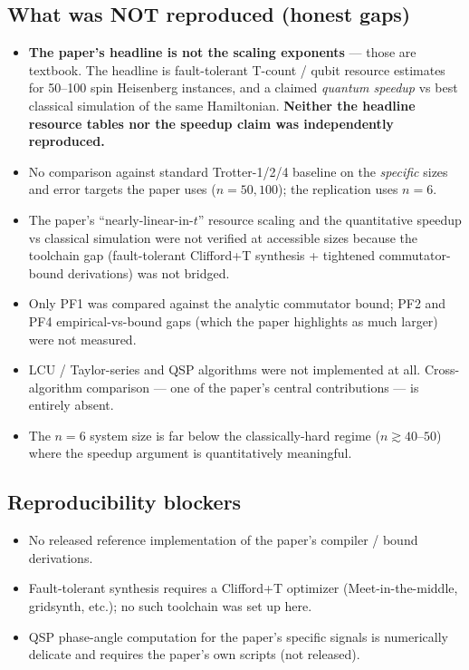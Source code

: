 \documentclass[11pt]{article}
\begin{document}
\subsection*{What was NOT reproduced (honest gaps)}
\begin{itemize}
  \item \textbf{The paper's headline is not the scaling exponents} --- those
  are textbook. The headline is fault-tolerant T-count / qubit resource
  estimates for 50--100 spin Heisenberg instances, and a claimed
  \emph{quantum speedup} vs best classical simulation of the same
  Hamiltonian. \textbf{Neither the headline resource tables nor the speedup
  claim was independently reproduced.}
  \item No comparison against standard Trotter-1/2/4 baseline on the
  \emph{specific} sizes and error targets the paper uses ($n=50,100$);
  the replication uses $n=6$.
  \item The paper's ``nearly-linear-in-$t$'' resource scaling and the
  quantitative speedup vs classical simulation were not verified at
  accessible sizes because the toolchain gap (fault-tolerant Clifford+T
  synthesis + tightened commutator-bound derivations) was not bridged.
  \item Only PF1 was compared against the analytic commutator bound; PF2
  and PF4 empirical-vs-bound gaps (which the paper highlights as much
  larger) were not measured.
  \item LCU / Taylor-series and QSP algorithms were not implemented at all.
  Cross-algorithm comparison --- one of the paper's central contributions
  --- is entirely absent.
  \item The $n=6$ system size is far below the classically-hard regime
  ($n\gtrsim 40$--$50$) where the speedup argument is quantitatively meaningful.
\end{itemize}

\subsection*{Reproducibility blockers}
\begin{itemize}
  \item No released reference implementation of the paper's compiler /
  bound derivations.
  \item Fault-tolerant synthesis requires a Clifford+T optimizer
  (Meet-in-the-middle, gridsynth, etc.); no such toolchain was set up here.
  \item QSP phase-angle computation for the paper's specific signals is
  numerically delicate and requires the paper's own scripts (not released).
\end{itemize}
\end{document}
